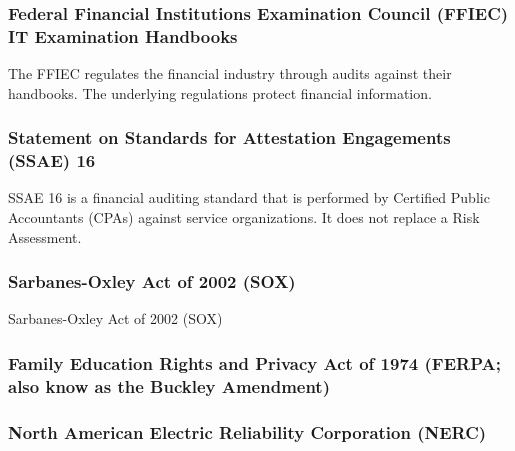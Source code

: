\subsubsection{Federal Financial Institutions Examination Council (FFIEC) IT Examination Handbooks}
The FFIEC regulates the financial industry through audits against their handbooks. The underlying regulations protect financial information.
\subsubsection{Statement on Standards for Attestation Engagements (SSAE) 16}
SSAE 16 is a financial auditing standard that is performed by Certified Public Accountants (CPAs) against service organizations. It does not replace a Risk Assessment.
\subsubsection{Sarbanes-Oxley Act of 2002 (SOX)}
Sarbanes-Oxley Act of 2002 (SOX)
\subsubsection{Family Education Rights and Privacy Act of 1974 (FERPA; also know as the Buckley Amendment)}
\subsubsection{North American Electric Reliability Corporation (NERC)}
